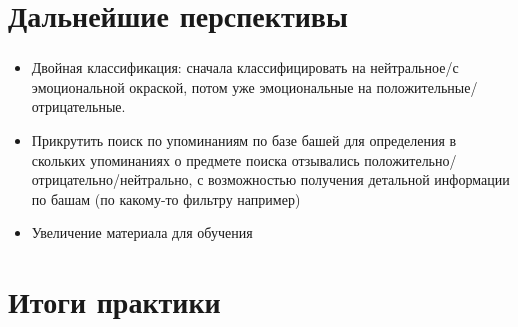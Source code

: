 \documentclass[t]{beamer}
\begin{document}
	\section{Дальнейшие перспективы}
	\begin{frame}
		\frametitle{\insertsection}
		\begin{itemize}
			\item
			{Двойная классификация: сначала классифицировать на нейтральное/с эмоциональной окраской, потом уже эмоциональные на положительные/отрицательные. }
			\item
			{Прикрутить поиск по упоминаниям по базе башей для определения в скольких упоминаниях о предмете поиска отзывались положительно/отрицательно/нейтрально, с возможностью получения детальной информации по башам (по какому-то фильтру например)}
			\item
			Увеличение материала для обучения 
			
		\end{itemize}
		
	\end{frame}
		
	
	\section{Итоги практики}
	
\end{document}
